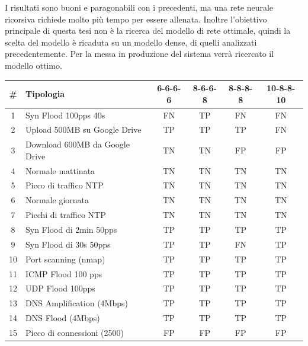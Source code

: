 I risultati sono buoni e paragonabili con i precedenti, ma una rete neurale ricorsiva richiede molto più tempo per essere allenata. Inoltre l'obiettivo principale di questa tesi non è la ricerca del modello di rete ottimale, quindi la scelta del modello è ricaduta su un modello dense, di quelli analizzati precedentemente. Per la messa in produzione del sistema verrà ricercato il modello ottimo.
\FloatBarrier
\begin{table}
    \begin{tabularx}{\textwidth}{||c X c c c c||} 
        \hline
        \# & Tipologia & 6-6-6-6 & 8-6-6-8 & 8-8-8-8 & 10-8-8-10\\ [0.5ex] 
        \hline\hline
        1 & Syn Flood 100pps 40s & \cellcolor{magenta} FN & TP & \cellcolor{magenta} FN & \cellcolor{magenta} FN  \\ 
        \hline
        2 & Upload 500MB su Google Drive & TP & TP & TP & \cellcolor{magenta} FN   \\ 
        \hline
        3 &  Download 600MB da Google Drive & TN  & TN & \cellcolor{orange} FP & \cellcolor{orange} FP \\ 
        \hline 
        4 & Normale mattinata & TN & TN & TN & TN \\
        \hline
        5 & Picco di traffico NTP & TN & TN & TN & TN  \\
        \hline
        6 & Normale giornata & TN & TN & TN & TN  \\ 
        \hline
        7 & Picchi di traffico NTP & TN & TN & TN & TN   \\ 
        \hline 
        8 & Syn Flood di 2min 50pps & TP & TP & TP & TP  \\
        \hline
        9 & Syn Flood di 30s 50pps & TP & TP & \cellcolor{magenta} FN & TP  \\        
        \hline
        10 & Port scanning (nmap) & TP & TP & TP & TP   \\
        \hline
        11 & ICMP Flood 100 pps & TP & TP & TP & TP \\
        \hline
        12 & UDP Flood 100pps & TP & TP & TP & TP \\ 
        \hline
        13 & DNS Amplification (4Mbps) & TP & TP & TP & TP \\ 
        \hline 
        14 & DNS Flood (4Mbps) & TP & TP & TP & TP \\
        \hline
        15 & Picco di connessioni (2500) & \cellcolor{orange} FP & \cellcolor{orange} FP & \cellcolor{orange} FP & \cellcolor{orange} FP \\        

\end{tabularx}
\end{table}
